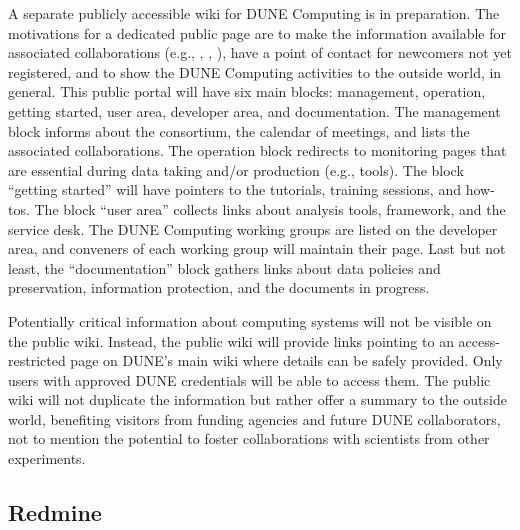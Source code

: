 \documentclass[../main-v1.tex]{subfiles}
\begin{document}
A separate publicly accessible wiki for DUNE Computing is in preparation. The motivations for a dedicated public page are to make the information available for associated collaborations (e.g., , , ), have a point of contact for newcomers not yet registered, and to show the DUNE Computing activities to the outside world, in general. This public portal will have six main blocks: management, operation, getting started, user area, developer area, and documentation. The management block informs about the consortium, the calendar of meetings, and lists the associated collaborations. The operation block redirects to monitoring pages that are essential during data taking and/or production (e.g.,  tools). The block ``getting started'' will have pointers to the tutorials, training sessions, and how-tos. The block ``user area'' collects links about analysis tools, framework, and %
the  service desk. The DUNE Computing working groups are listed on the developer area, and conveners of each working group will maintain their page. Last but not least, the ``documentation'' block gathers links about data policies and preservation, information protection, and the documents in progress.

Potentially critical information about computing systems will not be visible on the public wiki. Instead, the public wiki will provide links pointing to an access-restricted page on DUNE’s main wiki where details can be safely provided. Only users with approved DUNE credentials will be able to access them. The public wiki will not duplicate the information but rather offer a summary to the outside world, benefiting visitors from funding agencies and future DUNE %
collaborators, not to mention the potential to foster collaborations with scientists from other experiments.


\subsection{Redmine}
\end{document}
